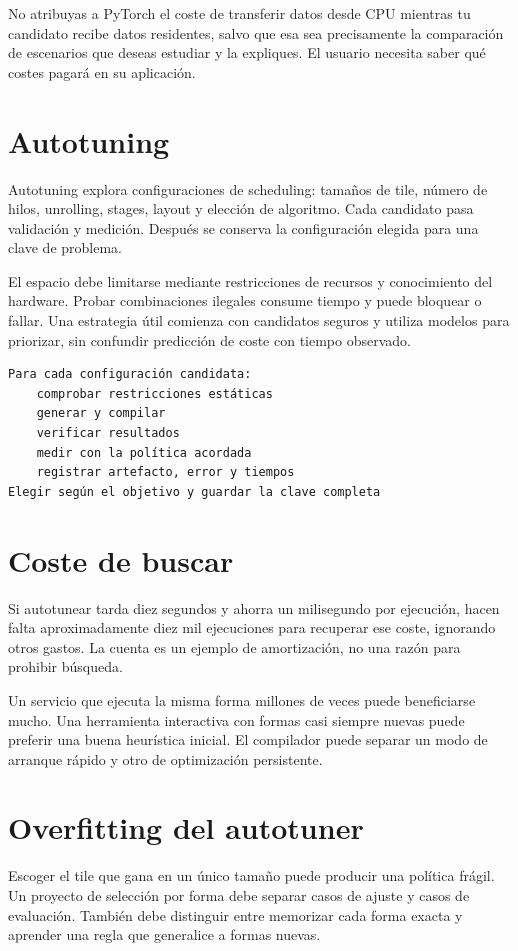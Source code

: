 \documentclass[12pt,a4paper,oneside]{report}
\begin{document}
No atribuyas a PyTorch el coste de transferir datos desde CPU mientras tu candidato recibe datos residentes, salvo que esa sea precisamente la comparación de escenarios que deseas estudiar y la expliques. El usuario necesita saber qué costes pagará en su aplicación.

\section{Autotuning}
Autotuning explora configuraciones de scheduling: tamaños de tile, número de hilos, unrolling, stages, layout y elección de algoritmo. Cada candidato pasa validación y medición. Después se conserva la configuración elegida para una clave de problema.

El espacio debe limitarse mediante restricciones de recursos y conocimiento del hardware. Probar combinaciones ilegales consume tiempo y puede bloquear o fallar. Una estrategia útil comienza con candidatos seguros y utiliza modelos para priorizar, sin confundir predicción de coste con tiempo observado.

\begin{lstlisting}
Para cada configuración candidata:
    comprobar restricciones estáticas
    generar y compilar
    verificar resultados
    medir con la política acordada
    registrar artefacto, error y tiempos
Elegir según el objetivo y guardar la clave completa
\end{lstlisting}
\section{Coste de buscar}
Si autotunear tarda diez segundos y ahorra un milisegundo por ejecución, hacen falta aproximadamente diez mil ejecuciones para recuperar ese coste, ignorando otros gastos. La cuenta es un ejemplo de amortización, no una razón para prohibir búsqueda.

Un servicio que ejecuta la misma forma millones de veces puede beneficiarse mucho. Una herramienta interactiva con formas casi siempre nuevas puede preferir una buena heurística inicial. El compilador puede separar un modo de arranque rápido y otro de optimización persistente.

\section{Overfitting del autotuner}
Escoger el tile que gana en un único tamaño puede producir una política frágil. Un proyecto de selección por forma debe separar casos de ajuste y casos de evaluación. También debe distinguir entre memorizar cada forma exacta y aprender una regla que generalice a formas nuevas.
\end{document}
